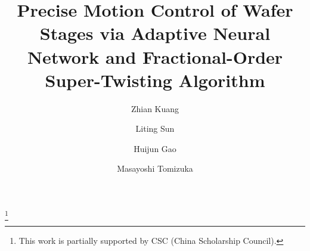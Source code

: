 \documentclass{ifacconf}
\begin{document}
\begin{frontmatter}

\title{Precise Motion Control of Wafer Stages via Adaptive Neural Network and Fractional-Order Super-Twisting Algorithm} 

\thanks[footnoteinfo]{This work is partially supported by CSC (China Scholarship Council).}

\author[First,Second]{Zhian Kuang} 
\author[Second]{Liting Sun}
\author[First]{Huijun Gao}
\author[Second]{Masayoshi Tomizuka}

\address[First]{Research Institute of Intelligent Control and Systems, Harbin Institute of Technology, Harbin 150001, P.R. China (e-mail: zhiankuang@foxmail.com)}
\address[Second]{Mechanical Control System Lab, Mechanical Engineering Department, University of California, Berkeley, CA 94720, USA (e-mail:tomizuka@berkeley.edu)}



\end{frontmatter}
\end{document}
